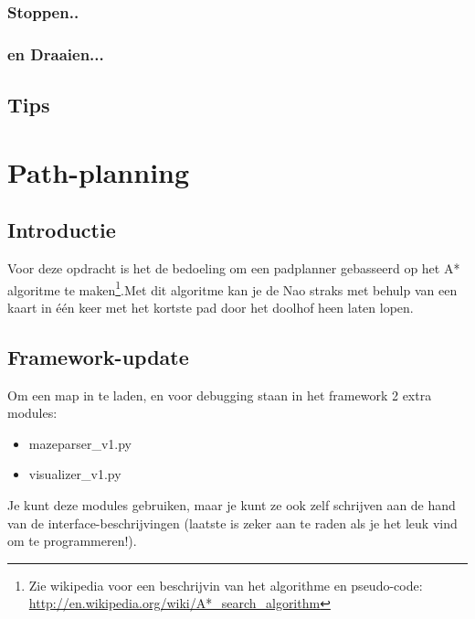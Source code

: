 \documentclass[a4paper, twoside]{article}
\begin{document}
\subsubsection{Stoppen..}
\subsubsection{en Draaien...}
\subsection{Tips}

\cleardoublepage
\section{Path-planning}
\subsection{Introductie}
Voor deze opdracht is het de bedoeling om een padplanner gebasseerd op het A* algoritme te maken\footnote{Zie wikipedia voor een beschrijvin van het algorithme en pseudo-code: \url{http://en.wikipedia.org/wiki/A*_search_algorithm}}.Met dit algoritme kan je de Nao straks met behulp van een kaart in \'e\'en keer met het kortste pad door het doolhof heen laten lopen. 

\subsection{Framework-update}
Om een map in te laden, en voor debugging staan in het framework 2 extra modules:
\begin{itemize}
\item mazeparser\_v1.py
\item visualizer\_v1.py
\end{itemize}

Je kunt deze modules gebruiken, maar je kunt ze ook zelf schrijven aan de hand van de interface-beschrijvingen (laatste is zeker aan te raden als je het leuk vind om te programmeren!).
\end{document}

